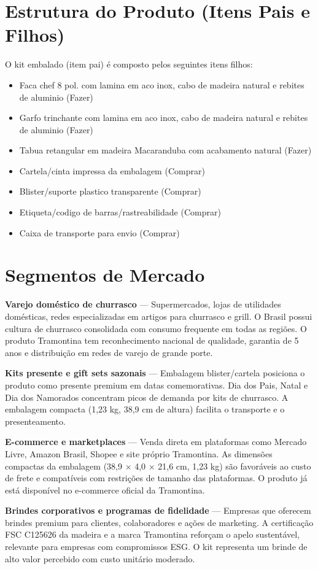 \documentclass[12pt,a4paper,oneside,english,brazil]{abntex2}
\begin{document}
\chapter{Estrutura do Produto (Itens Pais e Filhos)}
O kit embalado (item pai) é composto pelos seguintes itens filhos:
\begin{itemize}
  \item Faca chef 8 pol. com lamina em aco inox, cabo de madeira natural e rebites de aluminio (Fazer)
  \item Garfo trinchante com lamina em aco inox, cabo de madeira natural e rebites de aluminio (Fazer)
  \item Tabua retangular em madeira Macaranduba com acabamento natural (Fazer)
  \item Cartela/cinta impressa da embalagem (Comprar)
  \item Blister/suporte plastico transparente (Comprar)
  \item Etiqueta/codigo de barras/rastreabilidade (Comprar)
  \item Caixa de transporte para envio (Comprar)
\end{itemize}

\chapter{Segmentos de Mercado}
\textbf{Varejo doméstico de churrasco} --- Supermercados, lojas de utilidades domésticas, redes especializadas em artigos para churrasco e grill. O Brasil possui cultura de churrasco consolidada com consumo frequente em todas as regiões. O produto Tramontina tem reconhecimento nacional de qualidade, garantia de 5 anos e distribuição em redes de varejo de grande porte.

\textbf{Kits presente e gift sets sazonais} --- Embalagem blister/cartela posiciona o produto como presente premium em datas comemorativas. Dia dos Pais, Natal e Dia dos Namorados concentram picos de demanda por kits de churrasco. A embalagem compacta (1,23 kg, 38,9 cm de altura) facilita o transporte e o presenteamento.

\textbf{E-commerce e marketplaces} --- Venda direta em plataformas como Mercado Livre, Amazon Brasil, Shopee e site próprio Tramontina. As dimensões compactas da embalagem (38,9 × 4,0 × 21,6 cm, 1,23 kg) são favoráveis ao custo de frete e compatíveis com restrições de tamanho das plataformas. O produto já está disponível no e-commerce oficial da Tramontina.

\textbf{Brindes corporativos e programas de fidelidade} --- Empresas que oferecem brindes premium para clientes, colaboradores e ações de marketing. A certificação FSC C125626 da madeira e a marca Tramontina reforçam o apelo sustentável, relevante para empresas com compromissos ESG. O kit representa um brinde de alto valor percebido com custo unitário moderado.
\end{document}
